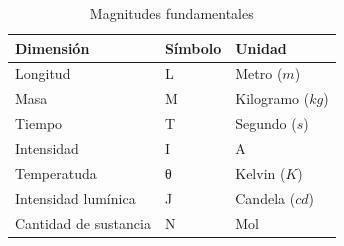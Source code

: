 \begin{table}[t]
    \centering
    \begin{threeparttable}
    \caption{Magnitudes fundamentales}
    \label{magn_fund}
    {
        \begin{tabular}{|p{}|p{}|p{}|} \hline
            \bfseries{Dimensión} & \textbf{Símbolo} & \textbf{Unidad} \\ \hline
            Longitud & L & Metro ($m$) \\ \hline
            Masa & M & Kilogramo ($kg$) \\ \hline
            Tiempo & T & Segundo ($s$) \\ \hline
            Intensidad & I & A \\ \hline
            Temperatuda & θ & Kelvin ($K$) \\ \hline
            Intensidad lumínica & J & Candela ($cd$) \\ \hline
            Cantidad de sustancia & N & Mol \\ \hline
        \end{tabular}}
        \begin{tablenotes} %
            \item[] 
        \end{tablenotes}
    \end{threeparttable}
\end{table}